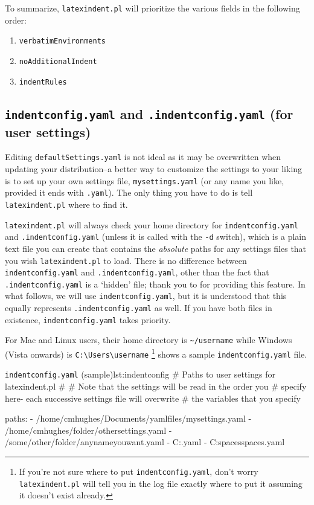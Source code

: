 \documentclass[11pt]{article}
\begin{document}
To summarize, \lstinline!latexindent.pl! will prioritize the various fields in the
following order:
\begin{enumerate}
	\item \lstinline!verbatimEnvironments!
	\item \lstinline!noAdditionalIndent!
	\item \lstinline!indentRules!
\end{enumerate}
\subsection{\lstinline!indentconfig.yaml! and \lstinline!.indentconfig.yaml! (for user settings)}\label{sec:indentconfig}
Editing \lstinline!defaultSettings.yaml! is not ideal as it may be overwritten when
updating your distribution--a better way to customize the settings to your liking
is to set up your own settings file,
\lstinline!mysettings.yaml! (or any name you like, provided it ends with \lstinline!.yaml!).
The only thing you have to do is tell \lstinline!latexindent.pl! where to find it.

\lstinline!latexindent.pl! will always check your home directory for \lstinline!indentconfig.yaml!
and  \lstinline!.indentconfig.yaml! (unless
it is called with the \lstinline!-d! switch),
which is a plain text file you can create that contains the \emph{absolute}
paths for any settings files that you wish \lstinline!latexindent.pl! to load. There is no difference
between \lstinline!indentconfig.yaml! and \lstinline!.indentconfig.yaml!, other than the
fact that \lstinline!.indentconfig.yaml! is a `hidden' file; thank you to \cite{jacobo-diaz-hidden-config}
for providing this feature. In what follows, we will use \lstinline!indentconfig.yaml!, but it
is understood that this equally represents \lstinline!.indentconfig.yaml! as well. If you
have both files in existence,  \lstinline!indentconfig.yaml! takes priority.

For Mac and Linux users, their home directory is \lstinline!~/username! while
Windows (Vista onwards) is \lstinline!C:\Users\username! \footnote{If you're not sure
	where to put \lstinline!indentconfig.yaml!, don't
	worry \lstinline!latexindent.pl! will tell you in the log file exactly where to
put it assuming it doesn't exist already.}
 shows a sample \lstinline!indentconfig.yaml! file.

\begin{cmhlistings}[style=yaml]{\lstinline!indentconfig.yaml! (sample)}{lst:indentconfig}
# Paths to user settings for latexindent.pl
#
# Note that the settings will be read in the order you
# specify here- each successive settings file will overwrite
# the variables that you specify

paths:
- /home/cmhughes/Documents/yamlfiles/mysettings.yaml
- /home/cmhughes/folder/othersettings.yaml
- /some/other/folder/anynameyouwant.yaml
- C:\Users\chughes\Documents\mysettings.yaml
- C:\Users\chughes\Desktop\test spaces\more spaces.yaml
\end{cmhlistings}
\end{document}
